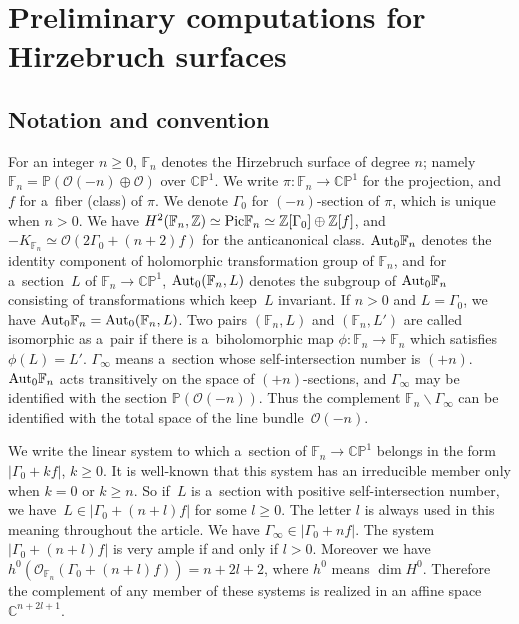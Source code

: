\section{Preliminary computations for Hirzebruch surfaces}
\label{s:Hirz}

\subsection{Notation and convention}
\label{ss:notation}

For an integer $n\ge 0$, $\mathbb{F}_n$ denotes the Hirzebruch surface of degree $n$; namely $\mathbb{F}_n=\mathbb
P(\mathscr O(-n)\oplus \mathscr O)$ over $\mathbb{CP}^1$.
We write $\pi:\mathbb{F}_n\to\mathbb{CP}^1$ for the projection, and $f$ for a~f\/iber (class) of $\pi$.
We denote $\Gamma_0$ for $(-n)$-section of $\pi$, which is unique when $n>0$.
We have $H^2(\mathbb{F}_n,\mathbb{Z})\simeq {\rm{Pic}}\mathbb{F}_n\simeq \mathbb{Z}[\Gamma_0]\oplus\mathbb{Z}[f]$, and
$-K_{\mathbb{F}_n}\simeq \mathscr O(2\Gamma_0 + (n+2)f)$ for the anticanonical class.
${\rm{Aut}}_0\mathbb{F}_n$ denotes the identity component of holomorphic transformation group of $\mathbb{F}_n$, and
for a~section~$L$ of $\mathbb{F}_n\to\mathbb{CP}^1$, ${\rm{Aut}}_0(\mathbb{F}_n,L)$ denotes the subgroup of
${\rm{Aut}}_0\mathbb{F}_n$ consisting of transformations which keep~$L$ invariant.
If $n>0$ and $L=\Gamma_0$, we have ${\rm{Aut}}_0\mathbb{F}_n= {\rm{Aut}}_0(\mathbb{F}_n,L)$.
Two pairs $(\mathbb{F}_n,L)$ and $(\mathbb{F}_n,L')$ are called isomorphic as a~pair if there is a~biholomorphic map
$\phi:\mathbb{F}_n \to \mathbb{F}_n$ which satisf\/ies $\phi(L) = L'$.
$\Gamma_{\infty}$ means a~section whose self-intersection number is $(+n)$.
${\rm{Aut}}_0\mathbb{F}_n$ acts transitively on the space of $(+n)$-sections, and $\Gamma_{\infty}$ may be
identif\/ied with the section $\mathbb P(\mathscr O(-n))$.
Thus the complement $\mathbb{F}_n\backslash \Gamma_{\infty}$ can be identif\/ied with the total space of the line bundle~$\mathscr O(-n)$.

We write the linear system to which a~section of $\mathbb{F}_n\to\mathbb{CP}^1$ belongs in the form $|\Gamma_0+kf|$, $k\ge 0$.
It is well-known that this system has an irreducible member only when $k=0$ or $k\ge n$.
So if~$L$ is a~section with positive self-intersection number, we have~$L\in |\Gamma_0 + (n+l)f|$ for some $l\ge 0$.
The letter $l$ is always used in this meaning throughout the article.
We have $\Gamma_{\infty}\in |\Gamma_0+nf|$.
The system $|\Gamma_0 + (n+l)f|$ is very ample if and only if $l>0$.
Moreover we have $h^0(\mathscr O_{\mathbb{F}_n}(\Gamma_0+(n+l)f))= n+2l+2$, where $h^0$ means $\dim H^0$.
Therefore the complement of any member of these systems is realized in an af\/f\/ine space $\mathbb{C}^{n+2l+1}$.

